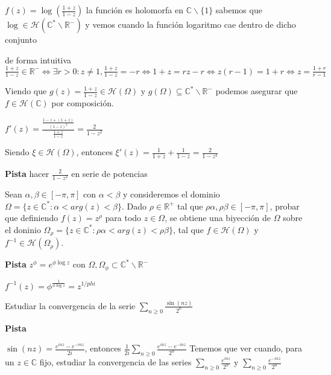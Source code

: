 \begin{sol}

$f(z) = \log(\frac{1+z}{1-z})$
la función es holomorfa en $\mathbb{C}\backslash \{1\}$
sabemos que $\log \in \mathcal{H}(\mathbb{C}^{\ast}\backslash\mathbb{R}^-)$
y vemos cuando la función logaritmo cae dentro de dicho conjunto

de forma intuitiva
$\frac{1+z}{1-z} \in\mathbb{R}^- \Longleftrightarrow \exists r>0 : z\not=1, \frac{1+z}{1-z} = -r \Longleftrightarrow 1+z = rz-r \Longleftrightarrow z(r-1)=1+r \Longleftrightarrow z = \frac{1+r}{r-1}$

Viendo que
$g(z) = \frac{1+z}{1-z} \in\mathcal{H}(\Omega)$ y $g(\Omega) \subseteq \mathbb{C}^{\ast}\backslash \mathbb{R}^-$
podemos asegurar que $f\in\mathcal{H}(\mathbb{C})$ por composición.

$f'(z) = \frac{ \frac{1-z+(1+z)}{(1-z)^2} }{ \frac{1+z}{1-z} } = \frac{2}{1-z^2}$

Siendo $\xi\in\mathcal{H}(\Omega)$, entonces
$\xi '(z) = \frac{1}{1+z} + \frac{1}{1-z} = \frac{2}{1-z^2}$



\textbf{Pista}
hacer $\frac{2}{1-z^2}$ en serie de potencias
\end{sol}





\begin{ejer}
	Sean $\alpha,\beta\in [-\pi,\pi]$ con $\alpha < \beta$ y consideremos el dominio $\Omega = \{ z\in\mathbb{C}^{\ast} : \alpha < arg(z) < \beta \}$. Dado $\rho\in\mathbb{R}^+$ tal que $\rho\alpha,\rho\beta\in[-\pi,\pi]$, probar que definiendo $f(z) = z^{\rho}$ para todo $z\in\Omega$, se obtiene una biyección de $\Omega$ sobre el doninio $\Omega_{\rho} = \{ z\in\mathbb{C}^{\ast} : \rho\alpha < arg(z) < \rho\beta \}$, tal que $f\in\mathcal{H}(\Omega)$ y $f^{-1}\in\mathcal{H}(\Omega_{\rho})$.
\end{ejer}
\textbf{Pista}
$z^{\phi} = e^{ \phi \log z}$ con $\Omega,\Omega_{\phi} \subset \mathbb{C}^{\ast}\backslash \mathbb{R^-}$

$f^{-1}(z) = \phi^{\frac{1}{\phi\log z}} = z^{1/{phi}}$


\begin{ejer}
	Estudiar la convergencia de la serie $\sum_{n\geq 0} \frac{\sin(nz)}{2^n}$
\end{ejer}
\textbf{Pista}

$\sin(nz) = \frac{e^{inz}-e^{-inz}}{2i}$, entonces
$\frac{1}{2i} \sum_{n\geq 0} \frac{e^{inz}-e^{-inz}}{2^n}$
Tenemos que ver cuando, para un $z\in\mathbb{C}$ fijo, estudiar la convergencia de las series
$\sum_{n\geq 0} \frac{e^{inz}}{2^n}$ y $\sum_{n\geq 0} \frac{e^{-inz}}{2^n}$

